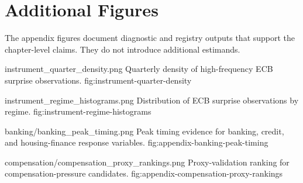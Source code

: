 \section{Additional Figures}
\label{app:additional-figures}

The appendix figures document diagnostic and registry outputs that support the chapter-level claims. They do not introduce additional estimands.

\thesisfigure
  {instrument_quarter_density.png}
  {Quarterly density of high-frequency ECB surprise observations.}
  {fig:instrument-quarter-density}

\thesisfigure
  {instrument_regime_histograms.png}
  {Distribution of ECB surprise observations by regime.}
  {fig:instrument-regime-histograms}

\thesisfigure
  {banking/banking_peak_timing.png}
  {Peak timing evidence for banking, credit, and housing-finance response variables.}
  {fig:appendix-banking-peak-timing}

\thesisfigure
  {compensation/compensation_proxy_rankings.png}
  {Proxy-validation ranking for compensation-pressure candidates.}
  {fig:appendix-compensation-proxy-rankings}
